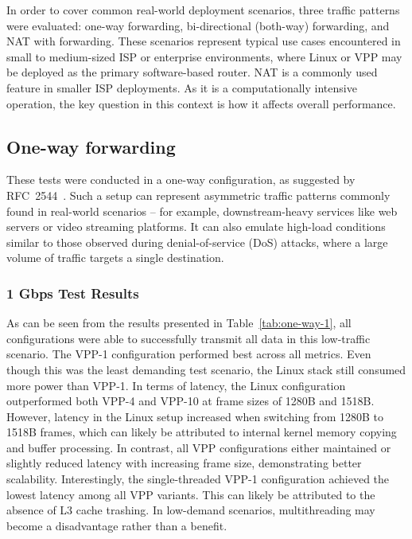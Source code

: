 In order to cover common real-world deployment scenarios, three traffic patterns were evaluated: one-way forwarding, bi-directional (both-way) forwarding, and NAT with forwarding.
These scenarios represent typical use cases encountered in small to medium-sized ISP or enterprise environments, where Linux or VPP may be deployed as the primary software-based router.
NAT is a commonly used feature in smaller ISP deployments. As it is a computationally intensive operation, the key question in this context is how it affects overall performance.

\subsection{One-way forwarding}

These tests were conducted in a one-way configuration, as suggested by RFC~2544~\cite{rfc2544}.
Such a setup can represent asymmetric traffic patterns commonly found in real-world scenarios -- for example, downstream-heavy services like web servers or video streaming platforms.
It can also emulate high-load conditions similar to those observed during denial-of-service (DoS) attacks, where a large volume of traffic targets a single destination. 

\subsubsection{1 Gbps Test Results}

As can be seen from the results presented in Table~\ref{tab:one-way-1}, all configurations were able to successfully transmit all data in this low-traffic scenario.
The VPP-1 configuration performed best across all metrics. Even though this was the least demanding test scenario, the Linux stack still consumed more power than VPP-1.
In terms of latency, the Linux configuration outperformed both VPP-4 and VPP-10 at frame sizes of 1280B and 1518B.
However, latency in the Linux setup increased when switching from 1280B to 1518B frames, which can likely be attributed to internal kernel memory copying and buffer processing.
In contrast, all VPP configurations either maintained or slightly reduced latency with increasing frame size, demonstrating better scalability.
Interestingly, the single-threaded VPP-1 configuration achieved the lowest latency among all VPP variants.
This can likely be attributed to the absence of L3 cache trashing. In low-demand scenarios, multithreading may become a disadvantage rather than a benefit.

